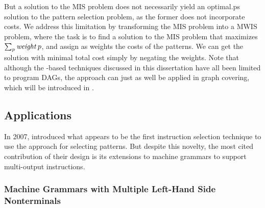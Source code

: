 But a solution to the \gls{MIS problem} does not necessarily yield an
\gls{optimal.ps} solution to the \gls{pattern selection} problem, as the
former does not incorporate costs.
%
We address this limitation by transforming
the \gls{MIS problem} into a \gls{MWIS problem}, where the task is to find a
solution to the \gls{MIS problem} that maximizes \mbox{$\sum_{p} \operatorname{\textrm{\textit{weight}}}{p}$},
and assign as weights the costs of the \glspl{pattern}.
%
We can get the solution
with minimal total cost simply by negating the weights.
%
Note that although the
-based techniques discussed in this dissertation have all been
limited to \glspl{program DAG}, the approach can just as well be applied in
\gls{graph covering}, which will be introduced in .


\subsection{Applications}

In 2007, \textcite{Scharwaechter2007} introduced what appears to be the first
\gls{instruction selection} technique to use the 
approach for selecting \glspl{pattern}.
%
But despite this novelty, the most cited contribution of their design is its
extensions to \glspl{machine grammar} to support \glspl{multi-output
  instruction}.


\subsubsection{Machine Grammars with Multiple Left-Hand Side Nonterminals}


